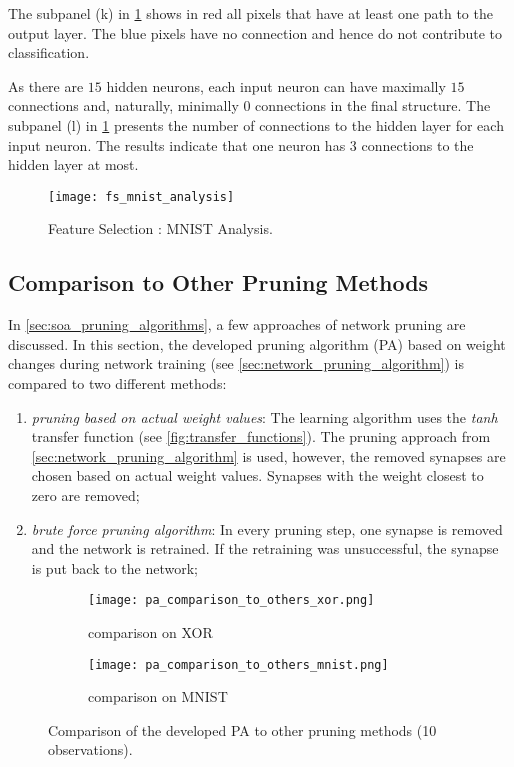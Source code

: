 The subpanel (k) in \cref{fig:mnist_analysis} shows in red all pixels that have at least one path to the output layer. The blue pixels have no connection and hence do not contribute to classification.

As there are $ 15 $ hidden neurons, each input neuron can have maximally $ 15 $ connections and, naturally, minimally $ 0 $ connections in the final structure. The subpanel (l) in \cref{fig:mnist_analysis} presents the number of connections to the hidden layer for each input neuron. The results indicate that one neuron has $ 3 $ connections to the hidden layer at most. 

\begin{figure}[H]
  \centering
  \texttt{[image: fs\_mnist\_analysis]}
  \caption{Feature Selection : MNIST Analysis.}
  \label{fig:mnist_analysis}
\end{figure}

\subsection{Comparison to Other Pruning Methods} \label{ssec:comparison_to_other_pa}
In \cref{sec:soa_pruning_algorithms}, a few approaches of network pruning are discussed. In this section, the developed pruning algorithm (PA) based on weight changes during network training (see \cref{sec:network_pruning_algorithm}) is compared to two different methods:

\begin{enumerate}[label=\Alph*]
\item \textit{pruning based on actual weight values}: The learning algorithm uses the \textit{tanh} transfer function (see \cref{fig:transfer_functions}). The pruning approach from \cref{sec:network_pruning_algorithm} is used, however, the removed synapses are chosen based on actual weight values. Synapses with the weight closest to zero are removed;
\item \textit{brute force pruning algorithm}: 
In every pruning step, one synapse is removed and the network is retrained. If the retraining was unsuccessful, the synapse is put back to the network;
\end{enumerate}

\begin{figure}[H]
\centering
\begin{subfigure}{0.49\textwidth}
  \centering
  \texttt{[image: pa\_comparison\_to\_others\_xor.png]}
  \caption{comparison on XOR}
  \label{fig:pa_comparison_xor}
\end{subfigure}%
\begin{subfigure}{0.49\textwidth}
  \centering
  \texttt{[image: pa\_comparison\_to\_others\_mnist.png]}
  \caption{comparison on MNIST}
  \label{fig:pa_comparison_mnist}
\end{subfigure}
\caption{Comparison of the developed PA to other pruning methods (10 observations).}
\label{fig:pa_comparison}
\end{figure}


